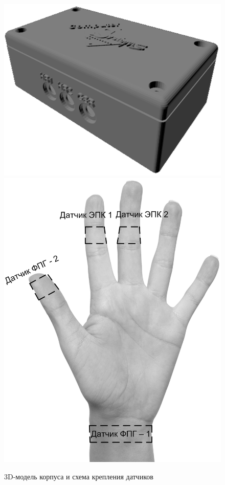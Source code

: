\documentclass[10pt, a5paper]{article}
\begin{document}
\begin{figure}[h!]
  \centering 
  \includegraphics[scale=0.35]{18_2015_fig2} \includegraphics[scale=0.15]{18_2015_fig3} 
  \caption{3D-модель корпуса и схема крепления датчиков} \label{latij2}
\end{figure}
\end{document}
